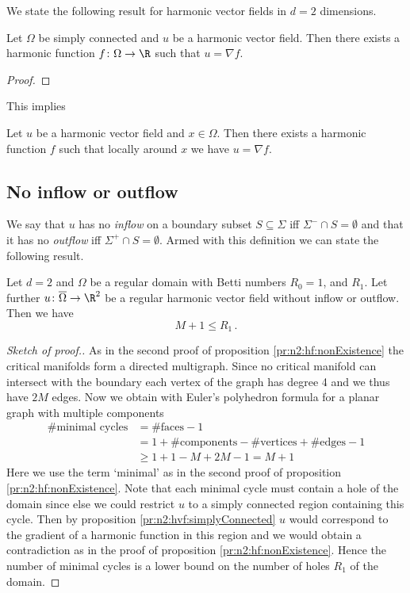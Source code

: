 We state the following result for harmonic vector fields in $d=2$ dimensions.
\begin{proposition}\label{pr:n2:hvf:simplyConnected}
  Let $\Omega$ be simply connected and $u$ be a harmonic vector field. Then there exists
  a harmonic function $f\colon\Omega\to\R$ such that $u=\nabla f$.
\end{proposition}
\begin{proof}
\end{proof}
This implies
\begin{corollary}
  Let $u$ be a harmonic vector field and $x\in\Omega$. Then there exists a harmonic function $f$ such
  that locally around $x$ we have $u=\nabla f$.
\end{corollary}

\subsection{No inflow or outflow}

We say that $u$ has no \emph{inflow} on a boundary subset $S\subseteq\Sigma$ iff $\Sigma^-\cap S=\emptyset$ and
that it has no \emph{outflow} iff $\Sigma^+\cap S=\emptyset$.
Armed with this definition we can state the following result.
\begin{proposition}
  Let $d=2$ and $\Omega$ be a regular domain with Betti numbers $R_0=1$, and $R_1$. Let further $u\colon\overline{\Omega}\to\R^2$ be 
  a regular harmonic vector field without inflow or outflow.
  Then we have $$M+1\leq R_1\,.$$
\end{proposition}
\begin{proof}[Sketch of proof.]
  As in the second proof of proposition \ref{pr:n2:hf:nonExistence} the critical manifolds form a directed multigraph.
  Since no critical manifold can intersect with the boundary each vertex
  of the graph has degree 4 and we thus have $2M$ edges. Now we obtain with Euler's polyhedron formula
  for a planar graph with multiple components
  \begin{align*}
    \text{\# minimal cycles}
    &= \text{\#faces}-1 \\
    &= 1+\text{\#components}-\text{\#vertices}+\text{\#edges} -1 \\
    &\geq 1+1-M+2M -1 = M+1
  \end{align*}
  Here we use the term `minimal' as in the second proof of proposition \ref{pr:n2:hf:nonExistence}.
  Note that each minimal cycle must contain a hole of the domain since else we could restrict $u$ to a simply
  connected region containing this cycle. Then by proposition \ref{pr:n2:hvf:simplyConnected} $u$ would correspond to the gradient of 
  a harmonic function in this region and we would obtain a contradiction as in the proof of proposition \ref{pr:n2:hf:nonExistence}.
  Hence the number of minimal cycles is a lower bound on the number of holes $R_1$ of the domain.
\end{proof}


